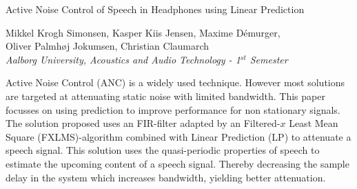 
\begin{center}
\begin{huge}
Active Noise Control of Speech in Headphones using Linear Prediction  
\end{huge}

\vspace{5mm}
Mikkel Krogh Simonsen, Kasper Kiis Jensen, Maxime Démurger, \\ Oliver Palmhøj Jokumsen, Christian Claumarch
\\
\textit{Aalborg University, Acoustics and Audio Technology - 1$^{st}$ Semester}


\vspace{5mm}

Active Noise Control (ANC) is a widely used technique. However most solutions are targeted at attenuating static noise with limited bandwidth. This paper focusses on using prediction to improve performance for non stationary signals.
The solution proposed uses an FIR-filter adapted by an Filtered-$x$ Least Mean Square (FXLMS)-algorithm combined with Linear Prediction (LP) to attenuate a speech signal. This solution uses the quasi-periodic properties of speech to estimate the upcoming content of a speech signal. Thereby decreasing the sample delay in the system which increases bandwidth, yielding better attenuation.















\end{center}